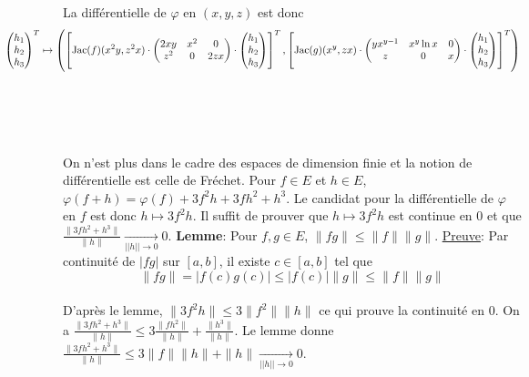 \documentclass{report}
\begin{document}
La différentielle de $\varphi$ en $(x,y,z)$ est donc 
$$\hspace{-2cm} \begin{pmatrix}
h_1 \\
h_2 \\
h_3
\end{pmatrix}^T \mapsto \left( \left[\operatorname{Jac}(f)(x^2y,z^2x) \cdot  \begin{pmatrix}
2xy & x^2 & 0 \\
z^2 & 0 & 2zx
\end{pmatrix}\cdot \begin{pmatrix}
h_1 \\
h_2 \\
h_3
\end{pmatrix}\right]^T, \left[\operatorname{Jac}(g)(x^y,zx) \cdot \begin{pmatrix}
yx^{y-1} & x^y\ln x & 0 \\
z & 0 & x
\end{pmatrix}\cdot \begin{pmatrix}
h_1 \\
h_2 \\
h_3
\end{pmatrix}\right]^T \right)$$

\subsection{} \noindent{}\\ 
\\ 
\\
\noindent On n'est plus dans le cadre des espaces de dimension finie et la notion de différentielle est celle de Fréchet.\newline
Pour $f\in E$ et $h\in E$, $\varphi(f+h) = \varphi(f) + 3f^2h + 3fh^2+h^3$.\newline
Le candidat pour la différentielle de $\varphi$ en $f$ est donc $h\mapsto 3f^2h $. \newline
Il suffit de prouver que $h\mapsto 3f^2h $ est continue en $0$ et que  $\frac{\| 3fh^2+h^3\|}{\|h \|} \xrightarrow[||h||\to 0]{}0$.\newline
\textbf{Lemme}: Pour $f,g\in E$, $\|fg\| \leq \|f\| \|g\|$.\newline
\underline{Preuve}: Par continuité de $|fg|$ sur $[a,b]$, il existe $c\in [a,b]$ tel que $$\|fg\| = |f(c)g(c)|\leq |f(c)| \|g\| \leq \|f\| \|g\|$$\\
\noindent D'après le lemme, $\|3f^2h \|\leq 3\|f^2\|\|h\|$ ce qui prouve la continuité en $0$.\newline
On a $\frac{\| 3fh^2+h^3\|}{\|h \|}\leq 3 \frac{\| f h^2\|}{\|h \|} + \frac{\|h^3 \|}{\|h \|}$.\newline
Le lemme donne $\frac{\| 3fh^2+h^3\|}{\|h \|}\leq 3\|f\| \|h\| + \|h\|\xrightarrow[||h||\to 0]{}0$.
\end{document}
